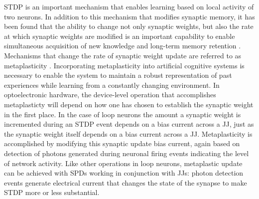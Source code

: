 \documentclass[twocolumn]{article}
\begin{document}
STDP is an important mechanism that enables learning based on local activity of two neurons. In addition to this mechanism that modifies synaptic memory, it has been found that the ability to change not only synaptic weights, but also the rate at which synaptic weights are modified is an important capability to enable simultaneous acquisition of new knowledge and long-term memory retention \cite{}. Mechanisms that change the rate of synaptic weight update are referred to as metaplasticity \cite{}. Incorporating metaplasticity into artificial cognitive systems is necessary to enable the system to maintain a robust representation of past experiences while learning from a constantly changing environment. In optoelectronic hardware, the device-level operation that accomplishes metaplasticty will depend on how one has chosen to establish the synaptic weight in the first place. In the case of loop neurons the amount a synaptic weight is incremented during an STDP event depends on a bias current across a JJ, just as the synaptic weight itself depends on a bias current across a JJ. Metaplasticity is accomplished by modifying this synaptic update bias current, again based on detection of photons generated during neuronal firing events indicating the level of network activity. Like other operations in loop neurons, metaplastic update can be achieved with SPDs working in conjunction with JJs: photon detection events generate electrical current that changes the state of the synapse to make STDP more or less substantial. 
\end{document}
